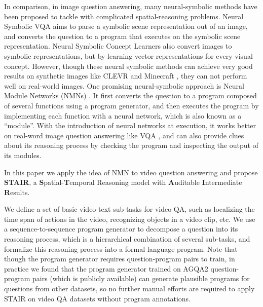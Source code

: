 \documentclass[letterpaper]{article} %
\begin{document}
In comparison, in image question answering, many neural-symbolic methods have been proposed to tackle with complicated spatial-reasoning problems. Neural Symbolic VQA \cite{yi2018neuralSymbolic} aims to parse a symbolic scene representation out of an image, and converts the question to a program that executes on the symbolic scene representation. Neural Symbolic Concept Learners \cite{Mao2019TheNC} also convert images to symbolic representations, but by learning vector representations for every visual concept.
However, though these neural symbolic methods can achieve very good results on synthetic images like CLEVR \cite{Johnson2016CLEVRAD} and Minecraft \cite{wu2017neural,yi2018neuralSymbolic}, they can not perform well on real-world images. One promising neural-symbolic approach is Neural Module Networks (NMNs) \cite{Andreas2015NeuralMN}. It first converts the question to a program composed of several functions using a program generator, and then executes the program by implementing each function with a neural network, which is also known as a ``module''. With the introduction of neural networks at execution, it works better on real-word image question answering like VQA \cite{Agrawal2015VQAVQ}, and can also provide clues about its reasoning process by checking the program and inspecting the output of its modules.

In this paper we apply the idea of NMN to video question answering and propose \textbf{STAIR}, a \textbf{S}patial-\textbf{T}emporal Reasoning model with \textbf{A}uditable \textbf{I}ntermediate \textbf{R}esults.

We define a set of basic video-text sub-tasks for video QA, such as localizing the time span of actions in the video, recognizing objects in a video clip, etc. We use a sequence-to-sequence program generator to decompose a question into its reasoning process, which is a hierarchical combination of several sub-tasks, and formalize this reasoning process into a formal-language program. Note that though the program generator requires question-program pairs to train, in practice we found that the program generator trained on AGQA2 \cite{GrundeMcLaughlin2022AGQA2} question-program pairs (which is publicly available) can generate plausible programs for questions from other datasets, so no further manual efforts are required to apply STAIR on video QA datasets without program annotations.
\end{document}
